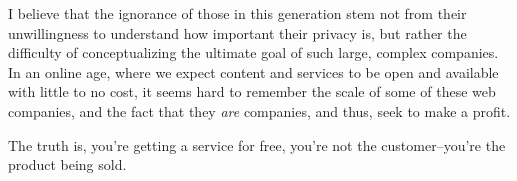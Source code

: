 \documentclass[letterpaper]{article}
\begin{document}
I believe that the ignorance of those in this generation stem not from their unwillingness to understand how important their privacy is, but rather the difficulty of conceptualizing the ultimate goal of such large, complex companies. In an online age, where we expect content and services to be open and available with little to no cost, it seems hard to remember the scale of some of these web companies, and the fact that they \emph{are} companies, and thus, seek to make a profit.

The truth is, you're getting a service for free, you're not the customer--you're the product being sold.
\end{document}
